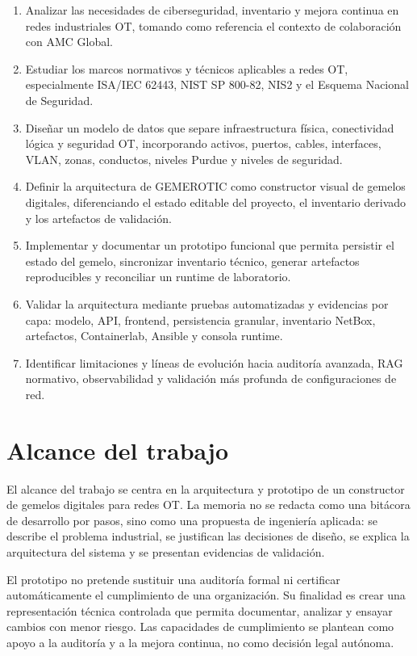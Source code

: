 \begin{enumerate}[label=\arabic*.]
    \item Analizar las necesidades de ciberseguridad, inventario y mejora continua en redes industriales OT, tomando como referencia el contexto de colaboración con AMC Global.
    \item Estudiar los marcos normativos y técnicos aplicables a redes OT, especialmente ISA/IEC 62443, NIST SP 800-82, NIS2 y el Esquema Nacional de Seguridad.
    \item Diseñar un modelo de datos que separe infraestructura física, conectividad lógica y seguridad OT, incorporando activos, puertos, cables, interfaces, VLAN, zonas, conductos, niveles Purdue y niveles de seguridad.
    \item Definir la arquitectura de GEMEROTIC como constructor visual de gemelos digitales, diferenciando el estado editable del proyecto, el inventario derivado y los artefactos de validación.
    \item Implementar y documentar un prototipo funcional que permita persistir el estado del gemelo, sincronizar inventario técnico, generar artefactos reproducibles y reconciliar un runtime de laboratorio.
    \item Validar la arquitectura mediante pruebas automatizadas y evidencias por capa: modelo, API, frontend, persistencia granular, inventario NetBox, artefactos, Containerlab, Ansible y consola runtime.
    \item Identificar limitaciones y líneas de evolución hacia auditoría avanzada, RAG normativo, observabilidad y validación más profunda de configuraciones de red.
\end{enumerate}

\section{Alcance del trabajo} \label{sec:alcance-trabajo}

El alcance del trabajo se centra en la arquitectura y prototipo de un constructor de gemelos digitales para redes OT. La memoria no se redacta como una bitácora de desarrollo por pasos, sino como una propuesta de ingeniería aplicada: se describe el problema industrial, se justifican las decisiones de diseño, se explica la arquitectura del sistema y se presentan evidencias de validación.

El prototipo no pretende sustituir una auditoría formal ni certificar automáticamente el cumplimiento de una organización. Su finalidad es crear una representación técnica controlada que permita documentar, analizar y ensayar cambios con menor riesgo. Las capacidades de cumplimiento se plantean como apoyo a la auditoría y a la mejora continua, no como decisión legal autónoma.

